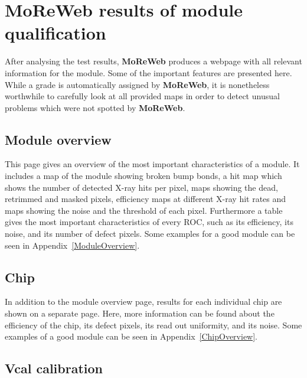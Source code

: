 \documentclass[a4paper,12pt,twoside]{article}
\begin{document}
\section{MoReWeb results of module qualification}

After analysing the test results, \textbf{MoReWeb} produces a webpage with all relevant information for the module. Some of the important features are presented here. While a grade is automatically assigned by \textbf{MoReWeb}, it is nonetheless worthwhile to carefully look at all provided maps in order to detect unusual problems which were not spotted by \textbf{MoReWeb}.

\subsection{Module overview}

This page gives an overview of the most important characteristics of a module. It includes a map of the module showing broken bump bonds, a hit map which shows the number of detected X-ray hits per pixel, maps showing the dead, retrimmed and masked pixels, efficiency maps at different X-ray hit rates and maps showing the noise and the threshold of each pixel. Furthermore a table gives the most important characteristics of every ROC, such as its efficiency, its noise, and its number of defect pixels. Some examples for a good module can be seen in Appendix~\ref{ModuleOverview}.

\subsection{Chip}

In addition to the module overview page, results for each individual chip are shown on a separate page. Here, more information can be found about the efficiency of the chip, its defect pixels, its read out uniformity, and its noise. Some examples of a good module can be seen in Appendix~\ref{ChipOverview}.

\subsection{Vcal calibration}
\end{document}
